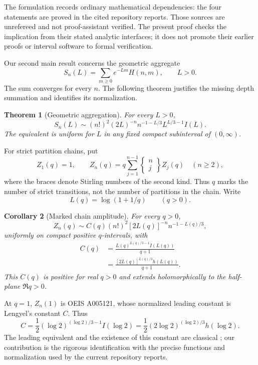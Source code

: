 \documentclass[11pt,letterpaper]{article}
\newtheorem{theorem}{Theorem}[section]
\newtheorem{corollary}[theorem]{Corollary}
\theoremstyle{remark}\newtheorem{remark}[theorem]{Remark}
\begin{document}
The formulation records ordinary mathematical dependencies: the four
statements are proved in the cited repository reports. Those sources
are unrefereed and not proof-assistant verified. The present proof
checks the implication from their stated analytic interfaces; it does
not promote their earlier proofs or interval software to formal
verification.

Our second main result concerns the geometric aggregate
\[
 S_n(L)=\sum_{m\ge0}e^{-Lm}H(n,m),\qquad L>0.
\]
The sum converges for every $n$. The following theorem justifies the
missing depth summation and identifies its normalization.

\begin{theorem}[Geometric aggregation]\label{ied:par:thm:aggregate}
For every $L>0$,
\begin{equation}\label{ied:par:eq:Sasym}
 S_n(L)\sim
 (n!)^2(2L)^{-n}n^{-1-L/3}L^{L/3-1}I(L).
\end{equation}
The equivalent is uniform for $L$ in any fixed compact subinterval of
$(0,\infty)$.
\end{theorem}

For strict partition chains, put
\[
 Z_1(q)=1,\qquad
 Z_n(q)=q\sum_{j=1}^{n-1}
 \left\{\begin{matrix}n\\j\end{matrix}\right\}Z_j(q)
 \quad(n\ge2),
\]
where the braces denote Stirling numbers of the second kind. Thus $q$
marks the number of strict transitions, not the number of partitions
in the chain. Write
\begin{equation}\label{ied:par:eq:Lq}
 L(q)=\log(1+1/q)\qquad(q>0).
\end{equation}
\begin{corollary}[Marked chain amplitude]\label{ied:par:cor:marked}
For every $q>0$,
\begin{equation}\label{ied:par:eq:Zasym}
 Z_n(q)\sim C(q)(n!)^2[2L(q)]^{-n}n^{-1-L(q)/3},
\end{equation}
uniformly on compact positive $q$-intervals, with
\begin{align}
 C(q)&=\frac{L(q)^{L(q)/3-1}I(L(q))}{q+1}\label{ied:par:eq:CqI}\\
 &=\frac{[2L(q)]^{L(q)/3}h(L(q))}{q+1}.\label{ied:par:eq:Cqh}
\end{align}
This $C(q)$ is positive for real $q>0$ and extends holomorphically to
the half-plane $\Re q>0$.
\end{corollary}
At $q=1$, $Z_n(1)$ is OEIS A005121, whose normalized leading constant is
Lengyel's constant $C$. Thus
\begin{equation}\label{ied:par:eq:Lengyel}
 C=\frac12(\log2)^{(\log2)/3-1}I(\log2)
   =\frac12(2\log2)^{(\log2)/3}h(\log2).
\end{equation}
The leading equivalent and the existence of this constant are classical
\cite{Lengyel,Prellberg}; our contribution is the rigorous identification
with the precise functions and normalization used by the current
repository reports.
\end{document}
